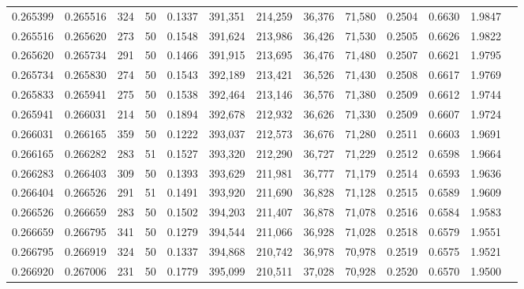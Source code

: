 \begin{tabular}{rrrrrrrrrrrrr}
0.265399 & 0.265516 &   324 &  50 &                                     0.1337 & 391,351 & 214,259 &  36,376 &  71,580 & 0.2504 & 0.6630 & 1.9847 \\
0.265516 & 0.265620 &   273 &  50 &                                     0.1548 & 391,624 & 213,986 &  36,426 &  71,530 & 0.2505 & 0.6626 & 1.9822 \\
0.265620 & 0.265734 &   291 &  50 &                                     0.1466 & 391,915 & 213,695 &  36,476 &  71,480 & 0.2507 & 0.6621 & 1.9795 \\
0.265734 & 0.265830 &   274 &  50 &                                     0.1543 & 392,189 & 213,421 &  36,526 &  71,430 & 0.2508 & 0.6617 & 1.9769 \\
0.265833 & 0.265941 &   275 &  50 &                                     0.1538 & 392,464 & 213,146 &  36,576 &  71,380 & 0.2509 & 0.6612 & 1.9744 \\
0.265941 & 0.266031 &   214 &  50 &                                     0.1894 & 392,678 & 212,932 &  36,626 &  71,330 & 0.2509 & 0.6607 & 1.9724 \\
0.266031 & 0.266165 &   359 &  50 &                                     0.1222 & 393,037 & 212,573 &  36,676 &  71,280 & 0.2511 & 0.6603 & 1.9691 \\
0.266165 & 0.266282 &   283 &  51 &                                     0.1527 & 393,320 & 212,290 &  36,727 &  71,229 & 0.2512 & 0.6598 & 1.9664 \\
0.266283 & 0.266403 &   309 &  50 &                                     0.1393 & 393,629 & 211,981 &  36,777 &  71,179 & 0.2514 & 0.6593 & 1.9636 \\
0.266404 & 0.266526 &   291 &  51 &                                     0.1491 & 393,920 & 211,690 &  36,828 &  71,128 & 0.2515 & 0.6589 & 1.9609 \\
0.266526 & 0.266659 &   283 &  50 &                                     0.1502 & 394,203 & 211,407 &  36,878 &  71,078 & 0.2516 & 0.6584 & 1.9583 \\
0.266659 & 0.266795 &   341 &  50 &                                     0.1279 & 394,544 & 211,066 &  36,928 &  71,028 & 0.2518 & 0.6579 & 1.9551 \\
0.266795 & 0.266919 &   324 &  50 &                                     0.1337 & 394,868 & 210,742 &  36,978 &  70,978 & 0.2519 & 0.6575 & 1.9521 \\
0.266920 & 0.267006 &   231 &  50 &                                     0.1779 & 395,099 & 210,511 &  37,028 &  70,928 & 0.2520 & 0.6570 & 1.9500 \\

\end{tabular}
